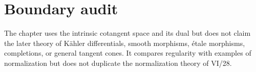 \section*{Boundary audit}
The chapter uses the intrinsic cotangent space and its dual but does not claim the later theory of Kähler differentials,
smooth morphisms, étale morphisms, completions, or general tangent cones.  It compares regularity with examples of
normalization but does not duplicate the normalization theory of VI/28.
